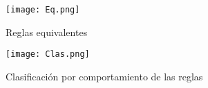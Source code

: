 \documentclass{article}
\begin{document}
	
	
	
	\vspace{150pt}
	\begin{figure}[h]
		\centering       
		\texttt{[image: Eq.png]}
		\caption{Reglas equivalentes}
		\label{fig:mi_imagen1}
	\end{figure}
	
	\begin{figure}[h]
		\centering       
		\texttt{[image: Clas.png]}
		\caption{Clasificación por comportamiento de las reglas}
		\label{fig:mi_imagen1}
	\end{figure}
	
\end{document}
